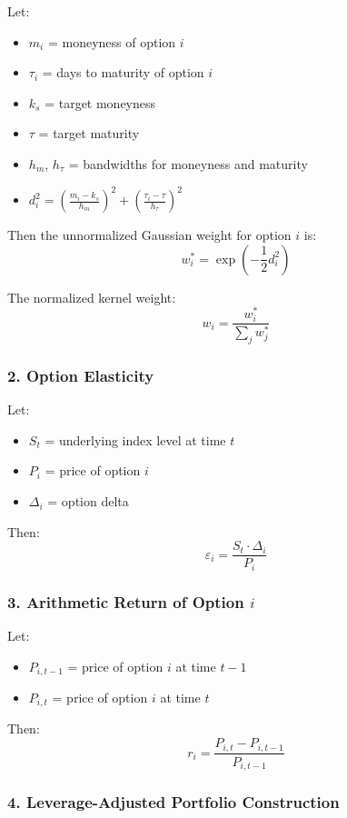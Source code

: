 \documentclass{article}
\begin{document}
\begin{appendices}
Let:
\begin{itemize}
  \item $m_{i}$ = moneyness of option $i$
  \item $\tau_{i}$ = days to maturity of option $i$
  \item $k_{s}$ = target moneyness
  \item $\tau$ = target maturity
  \item $h_{m}$, $h_{\tau}$ = bandwidths for moneyness and maturity
  \item $d_{i}^2 = \left( \frac{m_{i} - k_{s}}{h_{m}} \right)^2 + \left( \frac{\tau_{i} - \tau}{h_{\tau}} \right)^2$
\end{itemize}

Then the unnormalized Gaussian weight for option $i$ is:
\[
w_{i}^* = \exp\left( -\frac{1}{2} d_{i}^2 \right)
\]

The normalized kernel weight:
\[
w_{i} = \frac{w_{i}^*}{\sum_j w_j^*}
\]

\subsubsection*{2. Option Elasticity}

Let:
\begin{itemize}
  \item $S_{t}$ = underlying index level at time $t$
  \item $P_{i}$ = price of option $i$
  \item $\Delta_{i}$ = option delta
\end{itemize}

Then:
\[
\varepsilon_{i} = \frac{S_t \cdot \Delta_{i}}{P_{i}}
\]

\subsubsection*{3. Arithmetic Return of Option $i$}

Let:
\begin{itemize}
  \item $P_{i,t-1}$ = price of option $i$ at time $t-1$
  \item $P_{i,t}$ = price of option $i$ at time $t$
\end{itemize}

Then:
\[
r_{i} = \frac{P_{i,t} - P_{i,t-1}}{P_{i,t-1}}
\]

\subsubsection*{4. Leverage-Adjusted Portfolio Construction}


\end{appendices}
\end{document}
